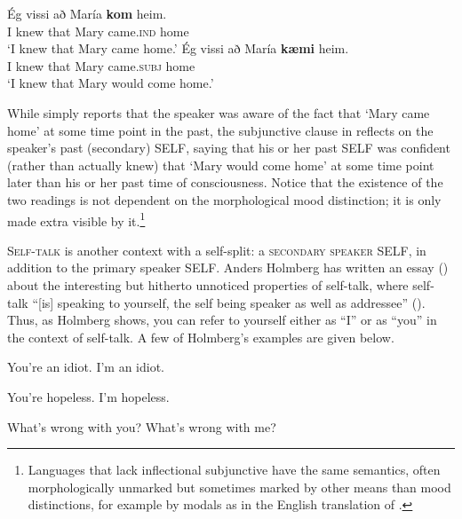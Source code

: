 \documentclass[output=paper]{LSP/langsci}
\begin{document}
\ea%
    \label{ex:Sigurdsson:19}
    \ea     \label{ex:Sigurdsson:19a}
\gll Ég  vissi  að  María  \textbf{kom}  heim.\\
    I  knew  that  Mary  came.\textsc{ind}  home\\
\glt    ‘I knew that Mary came home.’
\ex     \label{ex:Sigurdsson:19b}
\gll  Ég  vissi  að  María  \textbf{kæmi}  heim.\\
    I  knew  that  Mary  came.\textsc{subj}  home\\
\glt     ‘I knew that Mary would come home.’
\z
\z

While  simply reports that the speaker was aware of the fact that ‘Mary came home’ at some time point in the past, the subjunctive clause in  reflects on the speaker’s past (secondary) SELF, saying that his or her past SELF was confident (rather than actually knew) that ‘Mary would come home’ at some time point later than his or her past time of consciousness. Notice that the existence of the two readings is not dependent on the morphological mood distinction; it is only made extra visible by it.\footnote{Languages that lack inflectional subjunctive have the same semantics, often morphologically unmarked but sometimes marked by other means than mood distinctions, for example by modals as in the English translation of .}

\textsc{Self-talk} is another context with a self-split: a \textsc{secondary speaker SELF}, in addition to the primary speaker SELF. Anders Holmberg has written an essay (\citeyear{Holmberg2010yourself}) about the interesting but hitherto unnoticed properties of self-talk, where self-talk “[is] speaking to yourself, the self being speaker as well as addressee” (\citeyear[57]{Holmberg2010yourself}). Thus, as Holmberg shows, you can refer to yourself either as “I” or as “you” in the context of self-talk. A few of Holmberg’s examples are given below.

\ea%
    \label{ex:Sigurdsson:20}
    \ea  You’re an idiot.
\ex I’m an idiot.
\z
\z

\ea%
    \label{ex:Sigurdsson:21}
  \ea  You’re hopeless.
\ex  I’m hopeless.
\z
\z

\ea%
    \label{ex:Sigurdsson:22}

\ea What’s wrong with you?
\ex  What’s wrong with me?
\z
\z

\ea%
    \label{ex:Sigurdsson:23}

\z
\z
\end{document}
